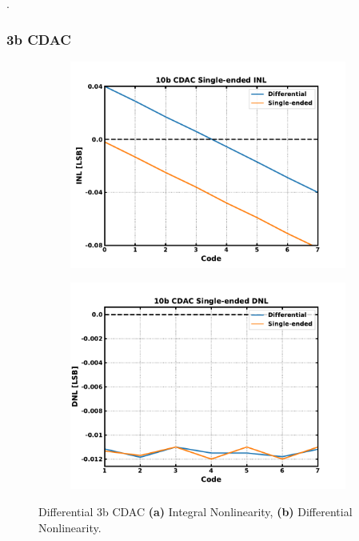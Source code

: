 {\color{white}.}
\FloatBarrier\pagebreak
\subsubsection{3b CDAC}\label{sec:res_cdac_3b}

	\begin{figure}[htb!]
	    \centering
	    \begin{subfigure}{0.5\textwidth}
	        \centering
	        \includegraphics[width=1\textwidth, angle=0]{./figs/results/cdac_3b_inl}
	        \caption{ }
	        \label{fig:cdac_3b_inl}
	    \end{subfigure}%
	    \begin{subfigure}{0.5\textwidth}
	        \centering
	        \includegraphics[width=1\textwidth, angle=0]{./figs/results/cdac_3b_dnl}
	        \caption{ }
	        \label{fig:cdac_3b_dnl}
	    \end{subfigure}
	    \label{fig:3b_cdac_nonlinearity}
	    \caption{Differential  3b CDAC \textbf{(a)} Integral Nonlinearity, \textbf{(b)} Differential Nonlinearity.}
	\end{figure} 

